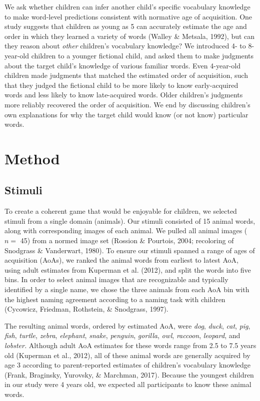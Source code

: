 \documentclass[10pt, letterpaper]{article}
\begin{document}
We ask whether children can infer another child's specific vocabulary
knowledge to make word-level predictions consistent with normative age
of acquisition. One study suggests that children as young as 5 can
accurately estimate the age and order in which they learned a variety of
words (Walley \& Metsala, 1992), but can they reason about \emph{other}
children's vocabulary knowledge? We introduced 4- to 8-year-old children
to a younger fictional child, and asked them to make judgments about the
target child's knowledge of various familiar words. Even 4-year-old
children made judgments that matched the estimated order of acquisition,
such that they judged the fictional child to be more likely to know
early-acquired words and less likely to know late-acquired words. Older
children's judgments more reliably recovered the order of acquisition.
We end by discussing children's own explanations for why the target
child would know (or not know) particular words.

\hypertarget{method}{%
\section{Method}\label{method}}

\hypertarget{stimuli}{%
\subsection{Stimuli}\label{stimuli}}

To create a coherent game that would be enjoyable for children, we
selected stimuli from a single domain (animals). Our stimuli consisted
of 15 animal words, along with corresponding images of each animal. We
pulled all animal images (\(n =\) 45) from a normed image set (Rossion
\& Pourtois, 2004; recoloring of Snodgrass \& Vanderwart, 1980). To
ensure our stimuli spanned a range of ages of acquisition (AoAs), we
ranked the animal words from earliest to latest AoA, using adult
estimates from Kuperman et al. (2012), and split the words into five
bins. In order to select animal images that are recognizable and
typically identified by a single name, we chose the three animals from
each AoA bin with the highest naming agreement according to a naming
task with children (Cycowicz, Friedman, Rothstein, \& Snodgrass, 1997).

The resulting animal words, ordered by estimated AoA, were \emph{dog},
\emph{duck}, \emph{cat}, \emph{pig}, \emph{fish}, \emph{turtle},
\emph{zebra}, \emph{elephant}, \emph{snake}, \emph{penguin},
\emph{gorilla}, \emph{owl}, \emph{raccoon}, \emph{leopard}, and
\emph{lobster.} Although adult AoA estimates for these words range from
2.5 to 7.5 years old (Kuperman et al., 2012), all of these animal words
are generally acquired by age 3 according to parent-reported estimates
of children's vocabulary knowledge (Frank, Braginsky, Yurovsky, \&
Marchman, 2017). Because the youngest children in our study were 4 years
old, we expected all participants to know these animal words.
\end{document}
